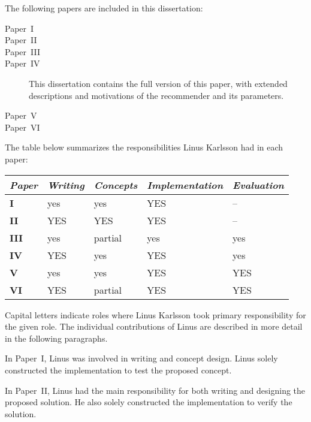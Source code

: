 The following papers are included in this dissertation:

\begin{description}
  \item[Paper~I]
    \paperIref
  \item[Paper~II]
    \paperIIref
  \item[Paper~III]
    \paperIIIref
  \item[Paper~IV]
    \paperIVref
    
    This dissertation contains the full version of this paper, with extended descriptions and motivations of the recommender and its parameters.
  \item[Paper~V]
    \paperVref
  \item[Paper~VI]
    \paperVIref
\end{description}

\newpage
\noindent
The table below summarizes the responsibilities Linus Karlsson had in each paper:

\vspace{1em}
\begin{center}
\begin{tabular}{lllll}
  \toprule
  \emph{Paper} & \emph{Writing} & \emph{Concepts} &  \emph{Implementation} & \emph{Evaluation} \\
  \midrule
  \textbf{I}    & yes     & yes     & YES & -- \\ 
  \textbf{II}   & YES     & YES     & YES & -- \\
  \textbf{III}  & yes     & partial & yes & yes \\
  \textbf{IV}   & YES     & yes     & YES & yes \\
  \textbf{V}    & yes     & yes     & YES & YES \\
  \textbf{VI}   & YES     & partial & YES & YES \\
  \bottomrule
\end{tabular}
\end{center}
\vspace{1em}

\noindent
Capital letters indicate roles where Linus Karlsson took primary responsibility for the given role.
The individual contributions of Linus are described in more detail in the following paragraphs.

In Paper~I, Linus was involved in writing and concept design.
Linus solely constructed the implementation to test the proposed concept.

In Paper~II, Linus had the main responsibility for both writing and designing the proposed solution.
He also solely constructed the implementation to verify the solution.

